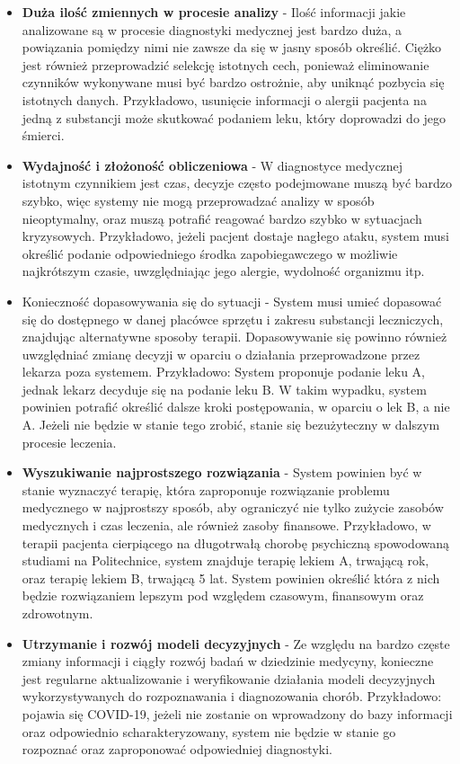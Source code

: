 \begin{itemize}
	\item \textbf{Duża ilość zmiennych w procesie analizy} - Ilość informacji jakie analizowane są w procesie diagnostyki medycznej jest bardzo duża, a powiązania pomiędzy nimi nie zawsze da się w jasny sposób określić. Ciężko jest również przeprowadzić selekcję istotnych cech, ponieważ eliminowanie czynników wykonywane musi być bardzo ostrożnie, aby uniknąć pozbycia się istotnych danych. Przykładowo, usunięcie informacji o alergii pacjenta na jedną z substancji może skutkować podaniem leku, który doprowadzi do jego śmierci.
	\item \textbf{Wydajność i złożoność obliczeniowa} - W diagnostyce medycznej istotnym czynnikiem jest czas, decyzje często podejmowane muszą być bardzo szybko, więc systemy nie mogą przeprowadzać analizy w sposób nieoptymalny, oraz muszą potrafić reagować bardzo szybko w sytuacjach kryzysowych. Przykładowo, jeżeli pacjent dostaje nagłego ataku, system musi określić podanie odpowiedniego środka zapobiegawczego w możliwie najkrótszym czasie, uwzględniając jego alergie, wydolność organizmu itp.
	\item Konieczność dopasowywania się do sytuacji - System musi umieć dopasować się do dostępnego w danej placówce sprzętu i zakresu substancji leczniczych, znajdując alternatywne sposoby terapii. Dopasowywanie się powinno również uwzględniać zmianę decyzji w oparciu o działania przeprowadzone przez lekarza poza systemem. Przykładowo: System proponuje podanie leku A, jednak lekarz decyduje się na podanie leku B. W takim wypadku, system powinien potrafić określić dalsze kroki postępowania, w oparciu o lek B, a nie A. Jeżeli nie będzie w stanie tego zrobić, stanie się bezużyteczny w dalszym procesie leczenia.
	\item \textbf{Wyszukiwanie najprostszego rozwiązania} - System powinien być w stanie wyznaczyć terapię, która zaproponuje rozwiązanie problemu medycznego w najprostszy sposób, aby ograniczyć nie tylko zużycie zasobów medycznych i czas leczenia, ale również zasoby finansowe. Przykładowo, w terapii pacjenta cierpiącego na długotrwałą chorobę psychiczną spowodowaną studiami na Politechnice, system znajduje terapię lekiem A, trwającą rok, oraz terapię lekiem B, trwającą 5 lat. System powinien określić która z nich będzie rozwiązaniem lepszym pod względem czasowym, finansowym oraz zdrowotnym.
	\item \textbf{Utrzymanie i rozwój modeli decyzyjnych} - Ze względu na bardzo częste zmiany informacji i ciągły rozwój badań w dziedzinie medycyny, konieczne jest regularne aktualizowanie i weryfikowanie działania modeli decyzyjnych wykorzystywanych do rozpoznawania i diagnozowania chorób. Przykładowo: pojawia się COVID-19, jeżeli nie zostanie on wprowadzony do bazy informacji oraz odpowiednio scharakteryzowany, system nie będzie w stanie go rozpoznać oraz zaproponować odpowiedniej diagnostyki.
\end{itemize}